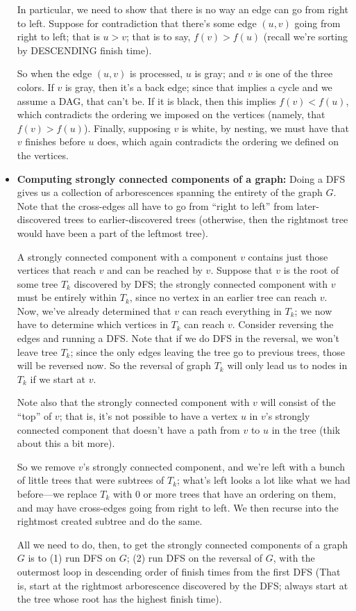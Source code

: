 \documentclass{article}
\begin{document}
\begin{itemize}
In particular, we need to show that there is no way an edge can go from right
to left.
Suppose for contradiction that there's some edge $(u,v)$ going from
right to left; that is $u > v$; that is to say, $f(v) > f(u)$ (recall we're
sorting by DESCENDING finish time).

So when the edge $(u,v)$ is processed, $u$ is gray; and $v$ is one of the three colors.
If $v$ is gray, then it's a back edge; since that implies a cycle and we assume
a DAG, that can't be.
If it is black, then this implies $f(v) < f(u)$, which contradicts the
ordering we imposed on the vertices (namely, that $f(v) > f(u)$).
Finally, supposing $v$ is white, by nesting, we must have that $v$
finishes before $u$ does, which again contradicts the ordering we defined on
the vertices.

\item
\textbf{Computing strongly connected components of a graph:}
Doing a DFS gives us a collection of arborescences spanning the entirety 
of the graph $G$.
Note that the cross-edges all have to go from ``right to left'' from 
later-discovered trees to earlier-discovered trees (otherwise, then the
rightmost tree would have been a part of the leftmost tree).

A strongly connected component with a component $v$ contains just those vertices
that reach $v$ and can be reached by $v$.
Suppose that $v$ is the root of some tree $T_k$ discovered by DFS; the strongly
connected component with $v$ must be entirely within $T_k$, since no
vertex in an earlier tree can reach $v$.
Now, we've already determined that $v$ can reach everything in $T_k$; we now
have to determine which vertices in $T_k$ can reach $v$.
Consider reversing the edges and running a DFS.
Note that if we do DFS in the reversal, we won't leave tree $T_k$; since
the only edges leaving the tree go to previous trees, those will
be reversed now.
So the reversal of graph $T_k$ will only lead us to nodes in $T_k$ if we
start at $v$.

Note also that the strongly connected component with $v$ will consist
of the ``top'' of $v$; that is, it's not possible to have a vertex
$u$ in $v$'s strongly connected component that doesn't have a path from
$v$ to $u$ in the tree (thik about this a bit more).

So we remove $v$'s strongly connected component, and we're left with a bunch
of little trees that were subtrees of $T_k$; what's left looks a lot
like what we had before---we replace $T_k$ with 0 or more trees that have an
ordering on them, and may have cross-edges going from right to left.
We then recurse into the rightmost created subtree and do the same.

All we need to do, then, to get the strongly connected components of a graph
$G$ is to (1) run DFS on $G$; (2) run DFS on the reversal of $G$, with
the outermost loop in descending order of finish times from the first
DFS (That is, start at the rightmost arborescence discovered by the DFS;
always start at the tree whose root has the highest finish time).

\end{itemize}
\end{document}
